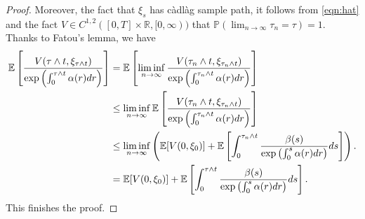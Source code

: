 \documentclass[11pt]{article}
\theoremstyle{theorem}
\theoremstyle{definition}
\newcommand{\1}{{\bf 1}}
\begin{document}
\begin{proof}
Moreover, 
the fact that $\xi_s$ has c\`adl\`ag sample path, it follows from \eqref{eqn:hat} and the fact  $V \in C^{1,2}([0, T] \times \mathbb{R}, [0, \infty))$ that 
$\mathbb{P}( \lim_{n\to \infty} \tau_n = \tau)=1.$
  Thanks to Fatou's lemma, we have 
 \begin{align*}
    \mathbb{E} \left[ \dfrac{V(\tau \wedge t, \xi_{\tau \wedge t})}{\exp \left( \int_0^{\tau \wedge t} \alpha(r)dr\right)}\right] 
&= \mathbb{E} \left[ \liminf_{n\to \infty} \dfrac{V(\tau_n \wedge t, \xi_{\tau_n \wedge t})}{\exp \left( \int_0^{\tau_n \wedge t} \alpha(r)dr\right)} \right] \notag\\
     & \leq  \liminf_{n\to \infty} \mathbb{E} \left[\dfrac{ V(\tau_n \wedge t, \xi_{\tau_n \wedge t})}{\exp \left( \int_0^{\tau_n \wedge t} \alpha(r)dr\right)} \right] \notag\\
  & \leq   \liminf_{n\to \infty}  \left( \mathbb{E}[V(0, \xi_0)]  + \mathbb{E} \left[ \int_0^{\tau_n \land t}  \dfrac{\beta(s)}{\exp \left( \int_0^{s} \alpha(r) dr \right)}ds \right] \right). \notag \\
   & =  \mathbb{E}[V(0, \xi_0)]  + \mathbb{E} \left[ \int_0^{\tau \land t}  \dfrac{\beta(s)}{\exp \left( \int_0^{s} \alpha(r) dr \right)}ds \right]. 
\end{align*}
This finishes the proof.
\end{proof}
\end{document}
